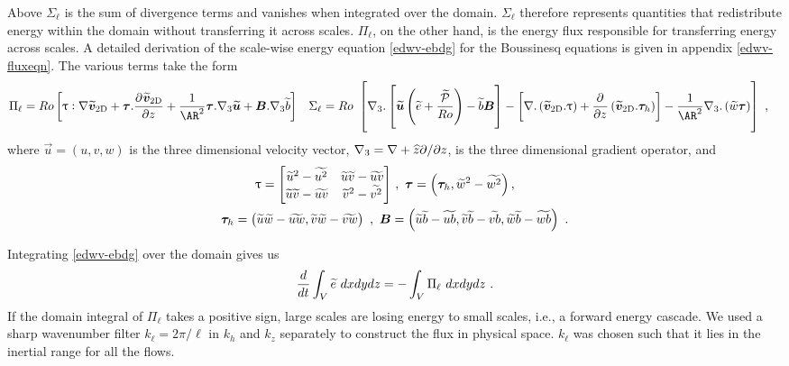 \documentclass[../Rajarshi-thesis-draft.tex]{subfiles}
\begin{document}
 Above $\Sigma_\ell$ is the sum of divergence terms and vanishes when integrated over the domain. $\Sigma_\ell$ therefore represents quantities that redistribute energy within the domain without transferring it across scales. $\Pi_\ell$, on the other hand, is the energy flux responsible for transferring energy across scales. A detailed derivation of the scale-wise energy equation \eqref{edwv-ebdg} for the Boussinesq equations is given in appendix \ref{edwv-fluxeqn}. The various terms take the form
     \begin{subequations}
        \begin{align}
            \label{edwv-pi}
            \Pi_\ell &= Ro\left[\uptau:\del\t{\vec{v}}_{\rm 2D} + \vec{\tau}.\Dp{\t{\vec{v}}_{\rm 2D}}{z}{} + \frac{1}{\AR^2}\vec{\tau}.\del_3 \t{\vec{u}} + \vec{B}.\del_3\t{b}\right]
        \end{align}
        \begin{align}
            \label{edwv-td}
            \Sigma_\ell &= Ro~\left[ \del_{3} .\left[\t{\vec{u}} \left(\t{e} + \frac{\t{\mathcal{P}}}{Ro}\right) - \t{b} \vec{B}\right] - \left[\del.\left(\t{\vec{v}}_{\rm 2D}.\uptau\right) + \Dp{}{z}{}\left(\t{\vec{v}}_{\rm 2D}.\vec{\tau}_h\right) \right] - \frac{1}{\AR^2}\del_3.\left(\t{w}\vec{\tau}\right)\right] \ ,
        \end{align}
    \end{subequations}
 where $\vec{u} =(u,v,w)$ is the three dimensional velocity vector, $\nabla_3 = \nabla + \widehat{z} \partial/ \partial z$, is the three dimensional gradient operator, and 
    \begin{align}
        \begin{split}
            \uptau = \left[\begin{matrix}
                \t{u}^2 - \t{u^2} & \t{u}\t{v} - \t{uv}\\
                \t{u}\t{v} - \t{uv} & \t{v}^2 - \t{v^2}\\
            \end{matrix}\right] &\ , \ 
            \vec{\tau} = \left(\vec{\tau}_h , \t{w}^2 - \t{w^2}\right), \\ 
            \vec{\tau}_h = \left(\t{u}\t{w} - \t{uw},\t{v}\t{w} - \t{vw}\right) \ , \ \vec{B} &= \left(\t{u}\t{b} - \t{ub},\t{v}\t{b} - \t{vb},\t{w}\t{b} - \t{wb}\right) \ .
        \end{split}
    \end{align}
    
    
 Integrating \eqref{edwv-ebdg} over the domain gives us
    \begin{align}
        \begin{split}
        \frac{d}{dt}\int_V \widetilde{e} \ dx dy dz = -\int_V \Pi_\ell \ dx dy dz \ .
        \end{split}
    \end{align}
 If the domain integral of $\Pi_\ell$ takes a positive sign, large scales are losing energy to small scales, i.e., a forward energy cascade. We used a sharp wavenumber filter $k_\ell=2\pi/\ell$ in $k_h$ and $k_z$ separately to construct the flux in physical space. $k_\ell$ was chosen such that it lies in the inertial range for all the flows. 
	
\end{document}

